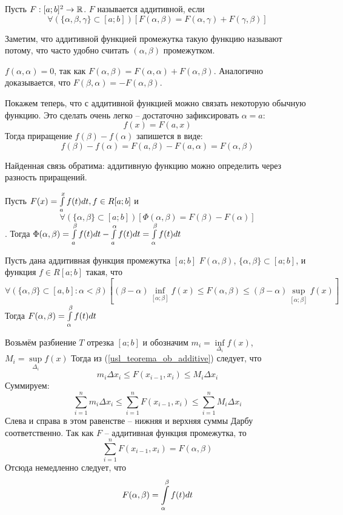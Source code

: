 \begin{opred}
Пусть $F:[a;b]^2 \to \mathbb{R}$. $F$ называется аддитивной, если
\begin{equation}\label{opr_additive}
\forall(\{\alpha,\beta,\gamma\}\subset[a;b])[F(\alpha,\beta)=F(\alpha,\gamma)+F(\gamma,\beta)]
\end{equation}
\end{opred}
Заметим, что аддитивной функцией промежутка такую функцию называют потому, что часто удобно считать $(\alpha,\beta)$ промежутком.

\begin{zamech}\label{zamech_additive_func_promezh}
$f(\alpha,\alpha)=0$, так как $F(\alpha,\beta)=F(\alpha,\alpha)+F(\alpha,\beta)$.
Аналогично доказывается, что $F(\beta,\alpha)=-F(\alpha,\beta)$.
\end{zamech}

Покажем теперь, что с аддитивной функцией можно связать некоторую обычную функцию.
Это сделать очень легко -- достаточно зафиксировать $\alpha=a$:
$$
f(x)=F(a,x)
$$
Тогда приращение $f(\beta)-f(\alpha)$ запишется в виде:
$$
f(\beta)-f(\alpha)=F(a,\beta)-F(a,\alpha)=F(\alpha,\beta)
$$

Найденная связь обратима: аддитивную функцию можно определить через разность приращений.

\begin{primer}
Пусть $F(x)=\int\limits_a^x f(t)dt, f\in R[a;b]$ и 
$$
\forall(\{\alpha,\beta\}\subset[a;b])[\Phi(\alpha,\beta)=F(\beta)-F(\alpha)]
$$.
Тогда $\Phi(\alpha,\beta)=\int\limits_a^\beta f(t)dt-\int\limits_a^\alpha f(t)dt=\int\limits_\alpha^\beta f(t)dt$
\end{primer}

\begin{teorema}
Пусть дана аддитивная функция промежутка $[a;b]$ $F(\alpha,\beta)$, $\{\alpha,\beta\}\subset[a;b]$,
и функция $f\in R[a;b]$ такая, что
\begin{equation}\label{usl_teorema_ob_additive}
\forall(\{\alpha,\beta\}\subset[a,b]:\alpha<\beta)
[(\beta-\alpha)\inf\limits_{[\alpha;\beta]}f(x)\leq F(\alpha,\beta)\leq(\beta-\alpha)\sup\limits_{[\alpha;\beta]}f(x)]
\end{equation}
Тогда $F(\alpha,\beta)=\int\limits_\alpha^\beta f(t)dt$
\end{teorema}
\dokvo
Возьмём разбиение $T$ отрезка $[a;b]$ и обозначим $m_i=\inf\limits_{\Delta_i}f(x)$, $M_i=\sup\limits_{\Delta_i}f(x)$
Тогда из (\ref{usl_teorema_ob_additive}) следует, что
$$
m_i\Delta x_i\leq F(x_{i-1},x_i)\leq M_i\Delta x_i
$$
Суммируем:
$$
\sum_{i=1}^n m_i\Delta x_i\leq \sum_{i=1}^n F(x_{i-1},x_i)\leq \sum_{i=1}^n M_i\Delta x_i
$$
Слева и справа в этом равенстве -- нижняя и верхняя суммы Дарбу соответственно.
Так как $F$ -- аддитивная функция промежутка, то 
$$
\sum_{i=1}^n F(x_{i-1},x_i)=F(\alpha,\beta)
$$
Отсюда немедленно следует, что 
$$
F(\alpha,\beta)=\int\limits_\alpha^\beta f(t)dt
$$
\dokno


